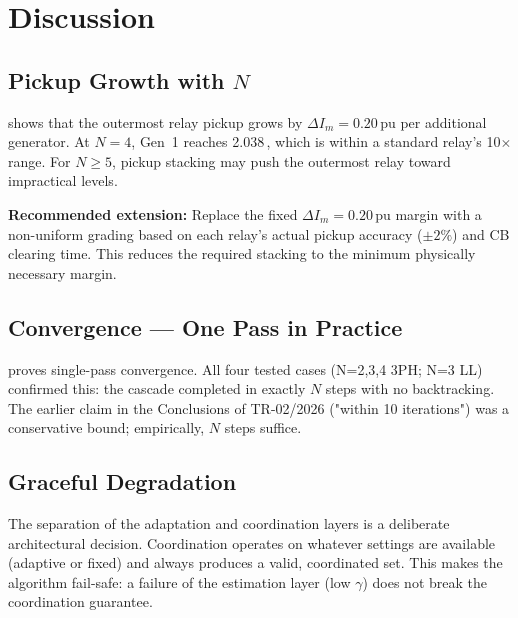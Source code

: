\documentclass[12pt,a4paper]{article}
\theoremstyle{definition}
\theoremstyle{plain}
\begin{document}
\section{Discussion}
\label{sec:disc}

\subsection{Pickup Growth with $N$}
\label{sec:disc:growth}

 shows that the outermost relay pickup grows by
$\Delta I_m = 0.20\,\text{pu}$ per additional generator.  At $N=4$,
Gen~1 reaches 2.038\,, which is within a standard relay's
10$\times$ range.  For $N \geq 5$, pickup stacking may push the outermost
relay toward impractical levels.

\textbf{Recommended extension:} Replace the fixed $\Delta I_m = 0.20\,\text{pu}$
margin with a non-uniform grading based on each relay's actual pickup
accuracy ($\pm 2\%$) and CB clearing time.  This reduces the required
stacking to the minimum physically necessary margin.

\subsection{Convergence — One Pass in Practice}
\label{sec:disc:convergence}

 proves single-pass convergence.  All four tested
cases (N=2,3,4 3PH; N=3 LL) confirmed this: the cascade completed in exactly
$N$ steps with no backtracking.  The earlier claim in the Conclusions of
TR-02/2026 ("within 10 iterations") was a conservative bound; empirically,
$N$ steps suffice.

\subsection{Graceful Degradation}
\label{sec:disc:degradation}

The separation of the adaptation and coordination layers is a deliberate
architectural decision.  Coordination operates on whatever settings are
available (adaptive or fixed) and always produces a valid, coordinated set.
This makes the algorithm fail-safe: a failure of the estimation layer
(low $\gamma$) does not break the coordination guarantee.
\end{document}

